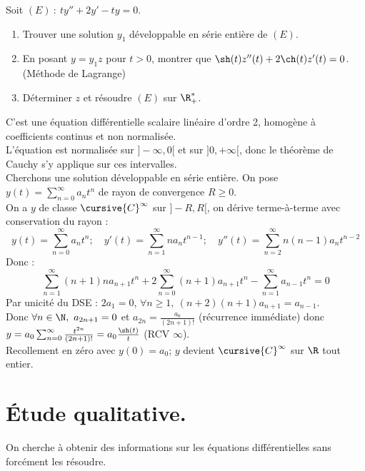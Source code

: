 \documentclass[11pt]{article}
\begin{document}
\begin{exercice}{}{}
    Soit $(E) ~:~ ty'' + 2y' - ty = 0$.
    \begin{enumerate}
        \item Trouver une solution $y_1$ développable en série entière de $(E)$.
        \item En posant $y=y_1z$ pour $t>0$, montrer que $\sh(t)z''(t)+2\ch(t)z'(t)=0$. (Méthode de Lagrange)
        \item Déterminer $z$ et résoudre $(E)$ sur $\R_+^*$.
    \end{enumerate}
    \tcblower
    C'est une équation différentielle scalaire linéaire d'ordre 2, homogène à coefficients continus et non normalisée.\\
    L'équation est normalisée sur $]-\infty,0[$ et sur $]0,+\infty[$, donc le théorème de Cauchy s'y applique sur ces intervalles.\\
    Cherchons une solution développable en série entière. On pose $y(t)=\sum_{n=0}^{\infty}a_nt^n$ de rayon de convergence $R\geq0$.\\
    On a $y$ de classe $\cursive{C}^{\infty}$ sur $]-R,R[$, on dérive terme-à-terme avec conservation du rayon :
    \begin{equation*}
        y(t) = \sum_{n=0}^{\infty}a_nt^n; \quad y'(t) = \sum_{n=1}^\infty na_nt^{n-1}; \quad y''(t) = \sum_{n=2}^\infty n(n-1)a_nt^{n-2}
    \end{equation*} 
    Donc :
    \begin{equation*}
        \sum_{n=1}^{\infty}(n+1)na_{n+1}t^n + 2\sum_{n=0}^{\infty}(n+1)a_{n+1}t^n - \sum_{n=1}^{\infty}a_{n-1}t^n = 0
    \end{equation*}
    Par unicité du DSE : $2a_1 = 0$, $\forall n \geq 1, ~ (n+2)(n+1)a_{n+1} = a_{n-1}$.\\
    Donc $\forall n \in \N, ~ a_{2n+1} = 0$ et $a_{2n} = \frac{a_0}{(2n+1)!}$ (récurrence immédiate) donc $y=a_0\sum_{n=0}^{\infty}\frac{t^{2n}}{(2n+1)!}=a_0\frac{\sh(t)}{t}$ (RCV $\infty$).\\
    Recollement en zéro avec $y(0)=a_0$; $y$ devient $\cursive{C}^\infty$ sur $\R$ tout entier.
\end{exercice}

\pagebreak

\section{Étude qualitative.}

On cherche à obtenir des informations sur les équations différentielles sans forcément les résoudre.
\end{document}
